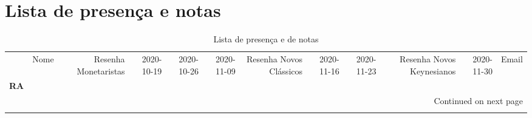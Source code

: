 \documentclass[11pt]{article}
\begin{document}
\section{Lista de presença e notas}
\label{sec:org24faf14}
\begin{center}\begin{landscape}
\small
\setlength\LTleft{0pt}
\setlength\LTright{0pt}
\begin{longtable}{llrrrrrrrrrl}
\caption{Lista de presença e de notas}\label{lista}\\
\toprule
{} &                                  Nome &  Resenha Monetaristas &  2020-10-19 &  2020-10-26 &  2020-11-09 &  Resenha Novos Clássicos &  2020-11-16 &  2020-11-23 &  Resenha Novos Keynesianos &  2020-11-30 &                   Email \\
\textbf{RA    } &                                       &                       &             &             &             &                          &             &             &                            &             &                         \\
\midrule
\endhead
\midrule
\multicolumn{12}{r}{{Continued on next page}} \\
\midrule
\endfoot


\end{longtable}
\end{landscape}
\end{center}
\end{document}
